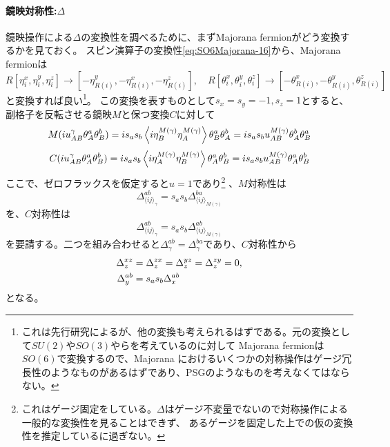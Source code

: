 \documentclass[11pt, aps, longbibliography]{article}
\begin{document}
        \paragraph{鏡映対称性:$\Delta$}
        鏡映操作による$\Delta$の変換性を調べるために、まずMajorana fermionがどう変換するかを見ておく。
        スピン演算子の変換性\eqref{eq:SO6Majorana-16}から、Majorana fermionは
        \begin{equation}\label{eq:SO6Majorana-19}
            R[\eta^x_i, \eta^y_i, \eta^z_i] \rightarrow [-\eta_{R(i)}^y, -\eta_{R(i)}^x, -\eta_{R(i)}^z], \quad R[\theta_i^x, \theta_i^y, \theta_i^z] \rightarrow [-\theta_{R(i)}^x, -\theta_{R(i)}^y, \theta_{R(i)}^z]
        \end{equation}
        と変換すれば良い\footnote{これは先行研究\cite{PhysRevB.102.075110}によるが、他の変換も考えられるはずである。元の変換として$SU(2)$や$SO(3)$やらを考えているのに対して
        Majorana fermionは$SO(6)$で変換するので、Majorana におけるいくつかの対称操作はゲージ冗長性のようなものがあるはずであり、PSGのようなものを考えなくてはならない。}。
        この変換を表すものとして$s_x=s_y=-1, s_z=1$とすると、
        副格子を反転させる鏡映$M$と保つ変換$C$に対して
        \begin{align}\label{eq:SO6Majorana-20}
            M(iu_{AB}^\gamma \theta_A^a\theta_B^b) = is_as_b\expval{i\eta_{B}^{M(\gamma)}\eta_{A}^{M(\gamma)}} \theta_{B}^a\theta_{A}^b = is_as_bu_{AB}^{M(\gamma)}\theta_A^b \theta_B^a
        \end{align}
        \begin{equation}\label{eq:SO6Majorana-21}
            C(iu_{AB}^\gamma \theta_A^a\theta_B^b) = is_as_b\expval{i\eta_{A}^{M(\gamma)}\eta_{B}^{M(\gamma)}} \theta_{A}^a\theta_{B}^b = is_as_bu_{AB}^{M(\gamma)}\theta_A^a \theta_B^b
        \end{equation}
        ここで、ゼロフラックスを仮定すると$u=1$であり\footnote{これはゲージ固定をしている。$\Delta$はゲージ不変量でないので対称操作による一般的な変換性を見ることはできず、
        あるゲージを固定した上での仮の変換性を推定しているに過ぎない。}
        、$M$対称性は
        \begin{equation}\label{eq:SO6Majorana-22}
            \Delta_{\langle ij\rangle_\gamma}^{ab} = s_as_b\Delta_{\langle ij\rangle_{M(\gamma)}}^{ba}
        \end{equation}
        を、$C$対称性は
        \begin{equation}\label{eq:SO6Majorana-23}
            \Delta_{\langle ij\rangle_\gamma}^{ab} = s_as_b\Delta_{\langle ij\rangle_{M(\gamma)}}^{ab}
        \end{equation}
        を要請する。二つを組み合わせると$\Delta_\gamma^{ab}= \Delta_\gamma^{ba} $であり、$C$対称性から
        \begin{align}\label{eq:SO6Majorana-24}
            \Delta_z^{xz} &= \Delta_z^{zx} = \Delta_z^{yz} = \Delta_z^{zy} = 0, \notag \\
            \Delta_y^{ab} &= s_as_b\Delta_x^{ab}
        \end{align}
        となる。
        
\end{document}
